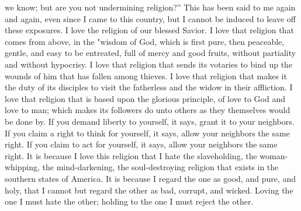 we know; but are you not undermining religion?'' This has been said to
me again and again, even since I came to this country, but I cannot be
induced to leave off these exposures. I love the religion of our blessed
Savior. I love that religion that comes from above, in the "wisdom of
God, which is first pure, then peaceable, gentle, and easy to be
entreated, full of mercy and good fruits, without partiality and without
hypocrisy. I love that religion that sends its votaries to bind up the
wounds of him that has fallen among thieves. I love that religion that
makes it the duty of its disciples to visit the fatherless and the widow
in their affliction. I love that religion that is based upon the
glorious principle, of love to God and love to man; which makes its
followers do unto others as they themselves would be done by. If you
demand liberty to yourself, it says, grant it to your neighbors. If you
claim a right to think for yourself, it says, allow your neighbors the
same right. If you claim to act for yourself, it says, allow your
neighbors the same right. It is because I love this religion that I hate
the slaveholding, the woman-whipping, the mind-darkening, the
soul-destroying religion that exists in the southern states of America.
It is because I regard the one as good, and pure, and holy, that I
cannot but regard the other as bad, corrupt, and wicked. Loving the one
I must hate the other; holding to the one I must reject the other.

